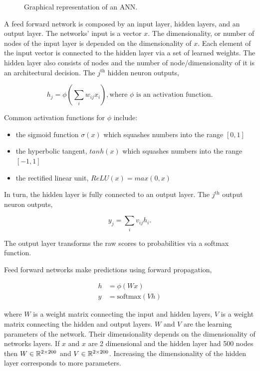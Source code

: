 \begin{figure}[!htbp]
    \centering
    
    \caption{Graphical representation of an ANN.}\label{fig:ann}
\end{figure}

A feed forward network is composed by an input layer, hidden layers, and an
output layer. The networks' input is a vector \(x\). The dimensionality, or
number of nodes of the input layer is depended on the dimensionality of \(x\).
Each element of the input vector is connected to the hidden layer via a set of
learned weights. The hidden layer also consists of nodes and the number of
node/dimensionality of it is an architectural decision. The \(j^{\text{th}}\)
hidden neuron outputs,

\[h_j = \phi (\sum_{i} w_{ij} x_{i}), \text{where } \phi  \text{ is an activation function}.\]

Common activation functions for \(\phi\) include:

\begin{itemize}
    \item the sigmoid function \(\sigma(x)\) which squashes numbers into the range \([0, 1]\)
    \item the hyperbolic tangent, \(tanh(x)\) which squashes numbers into the range \([-1, 1]\)
    \item the rectified linear unit, \(ReLU(x)=max(0,x)\)
\end{itemize}

In turn, the hidden layer is fully connected to an output layer. The
\(j^{\text{th}}\) output neuron outputs,

\[y_{j} = \sum_{i} v_{ij} h_{i}.\]

The output layer transforms the raw scores to probabilities via a softmax function.

Feed forward networks make predictions using forward propagation,

\begin{align}\label{eq:neural_network_equations}
h & = \phi(Wx) \\ \label{eq:neural_network_equations_two}
y & = \text{softmax}(Vh)
\end{align}

where \(W\) is a weight matrix connecting the input and hidden layers, \(V\) is
a weight matrix connecting the hidden and output layers. \(W\) and \(V\) are the
learning parameters of the network. Their dimensionality depends on the
dimensionality of networks layers. If \(x\) and \(x\) are  2 dimensional and the
hidden layer had 500 nodes then \(W \in \mathbb{R}^{2 \times 200}\) and \(V \in \mathbb{R}^{2
\times 200}\). Increasing the dimensionality of the hidden layer corresponds to
more parameters.

